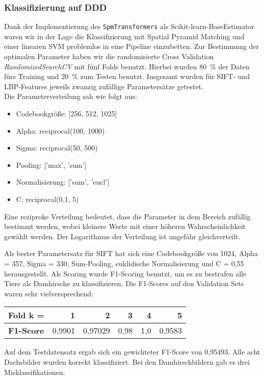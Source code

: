 \subsubsection{Klassifizierung auf DDD}

Dank der Implementierung des \texttt{SpmTransformers} als Scikit-learn-BaseEstimator waren wir in der Lage die Klassifizierung mit Spatial Pyramid Matching und einer linearen SVM problemlos in eine Pipeline einzubetten. Zur Bestimmung der optimalen Parameter haben wir die randomisierte Cross Validation \emph{RandomizedSearchCV} mit fünf Folds benutzt. Hierbei wurden 80~\% der Daten fürs Training und 20~\% zum Testen benutzt. Insgesamt wurden für SIFT- und LBP-Features jeweils zwanzig zufällige Parametersätze getestet.\\
Die Parameterverteilung sah wie folgt aus:
\begin{itemize}
	\item Codebookgröße: [256, 512, 1025]
	\item Alpha: reciprocal(100, 1000)
	\item Sigma: reciprocal(50, 500)
	\item Pooling: ['max', 'sum']
	\item Normalisierung: ['sum', 'eucl']
	\item C: reciprocal(0.1, 5)
\end{itemize} 

Eine reziproke Verteilung bedeutet, dass die Parameter in dem Bereich zufällig bestimmt werden, wobei kleinere Werte mit einer höheren Wahrscheinlichkeit gewählt werden. Der Logarithmus der Verteilung ist ungefähr gleichverteilt.

Als bester Parametersatz für SIFT hat sich eine Codebookgröße von 1024, Alpha = 357, Sigma = 330, Sum-Pooling, euklidische Normalisierung und C = 0,55 herausgestellt. Als Scoring wurde F1-Scoring benutzt, um es zu bestrafen alle Tiere als Damhirsche zu klassifizieren. Die F1-Scores auf den Validation Sets waren sehr vielversprechend:

\begin{center}
\begin{tabular}{|l|r|r|r|r|r|}
	\hline
	\textbf{Fold k = } & 1 & 2 & 3 & 4 & 5 \\ \hline
	\textbf{F1-Score} & 0,9901 & 0,97029 & 0,98 & 1,0 & 0,9583 \\ \hline
\end{tabular}
\end{center}

Auf dem Testdatensatz ergab sich ein gewichteter F1-Score von 0,95493. Alle acht Dachsbilder wurden korrekt klassifiziert. Bei den Damhirschbildern gab es drei Misklassifikationen. 

